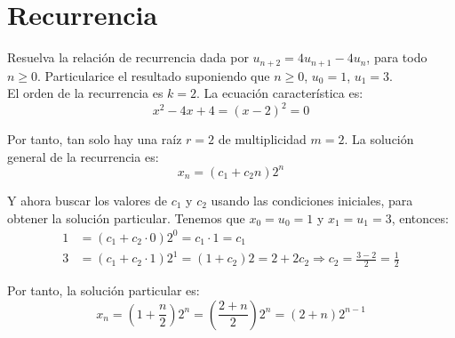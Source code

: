 \section{Recurrencia}

\begin{ejercicio}
    Resuelva la relación de recurrencia dada por $u_{n+2} = 4u_{n+1} - 4u_n$, para todo $n\geq 0$.
    Particularice el resultado suponiendo que $n\geq 0$, $u_0=1$, $u_1=3$.\\

    El orden de la recurrencia es $k=2$. La ecuación característica es:
    \begin{equation*}
        x^2-4x+4 = {(x-2)}^2=0
    \end{equation*}

    Por tanto, tan solo hay una raíz $r=2$ de multiplicidad $m=2$. La solución general de la recurrencia es:
    \begin{equation*}
        x_n = (c_1+c_2n)2^n
    \end{equation*}

    Y ahora buscar los valores de $c_1$ y $c_2$ usando las condiciones iniciales, para obtener la solución particular.
    Tenemos que $x_0=u_0=1$ y $x_1=u_1=3$, entonces:
    \begin{align*}
        1 &= (c_1+c_2\cdot 0) 2^0 = c_1\cdot 1 = c_1\\
        3 &= (c_1+c_2\cdot 1) 2^1 = (1+c_2) 2 = 2+2c_2 \Longrightarrow c_2 = \frac{3-2}{2} = \frac{1}{2}
    \end{align*}

    Por tanto, la solución particular es:
    \begin{equation*}
        x_n = \left(1+\frac{n}{2}\right)2^n = \left(\frac{2+n}{2}\right)2^n = (2+n)2^{n-1}
    \end{equation*}
\end{ejercicio}

